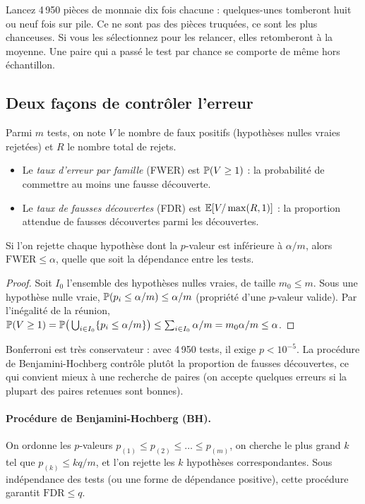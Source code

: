 \begin{intuition}
Lancez 4\,950 pièces de monnaie dix fois chacune : quelques-unes tomberont huit ou neuf fois sur pile. Ce ne sont pas des pièces truquées, ce sont les plus chanceuses. Si vous les \og sélectionnez\fg{} pour les relancer, elles retomberont à la moyenne. Une paire qui a passé le test par chance se comporte de même hors échantillon.
\end{intuition}

\subsection{Deux façons de contrôler l'erreur}

\begin{definition}
Parmi $m$ tests, on note $V$ le nombre de faux positifs (hypothèses nulles vraies rejetées) et $R$ le nombre total de rejets.
\begin{itemize}
\item Le \emph{taux d'erreur par famille} (FWER) est $\mathbb{P}(V\ge1)$ : la probabilité de commettre au moins une fausse découverte.
\item Le \emph{taux de fausses découvertes} (FDR) est $\mathbb{E}[V/\max(R,1)]$ : la proportion attendue de fausses découvertes parmi les découvertes.
\end{itemize}
\end{definition}

\begin{proposition}[Bonferroni]
Si l'on rejette chaque hypothèse dont la $p$-valeur est inférieure à $\alpha/m$, alors $\mathrm{FWER}\le\alpha$, quelle que soit la dépendance entre les tests.
\end{proposition}
\begin{proof}
Soit $I_0$ l'ensemble des hypothèses nulles vraies, de taille $m_0\le m$. Sous une hypothèse nulle vraie, $\mathbb{P}(p_i\le\alpha/m) \le \alpha/m$ (propriété d'une $p$-valeur valide). Par l'inégalité de la réunion, $\mathbb{P}(V\ge1) = \mathbb{P}\big(\bigcup_{i\in I_0}\{p_i\le\alpha/m\}\big) \le \sum_{i\in I_0}\alpha/m = m_0\alpha/m \le \alpha$.
\end{proof}

Bonferroni est très conservateur : avec 4\,950 tests, il exige $p < 10^{-5}$. La procédure de Benjamini-Hochberg contrôle plutôt la proportion de fausses découvertes, ce qui convient mieux à une recherche de paires (on accepte quelques erreurs si la plupart des paires retenues sont bonnes).

\paragraph{Procédure de Benjamini-Hochberg (BH).} On ordonne les $p$-valeurs $p_{(1)}\le p_{(2)}\le\dots\le p_{(m)}$, on cherche le plus grand $k$ tel que $p_{(k)}\le kq/m$, et l'on rejette les $k$ hypothèses correspondantes. Sous indépendance des tests (ou une forme de dépendance positive), cette procédure garantit $\mathrm{FDR}\le q$.

